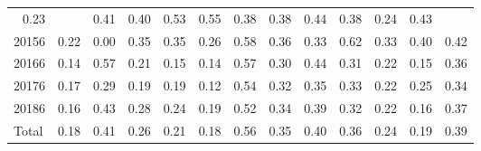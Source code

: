 \begin{table}[!h]
\begin{tabular}{lllllllllllll}
  \multicolumn{1}{|r}{0.23} &
  \multicolumn{1}{r}{} &
  \multicolumn{1}{r}{0.41} &
  \multicolumn{1}{r}{0.40} &
  \multicolumn{1}{r}{0.53} &
  \multicolumn{1}{r}{0.55} &
  \multicolumn{1}{r}{0.38} &
  \multicolumn{1}{r}{0.38} &
  \multicolumn{1}{r}{0.44} &
  \multicolumn{1}{r}{0.38} &
  \multicolumn{1}{r}{0.24} &
  \multicolumn{1}{r}{0.43} \\
\multicolumn{1}{l}{\hspace{1em}20156} &
  \multicolumn{1}{|r}{0.22} &
  \multicolumn{1}{r}{0.00} &
  \multicolumn{1}{r}{0.35} &
  \multicolumn{1}{r}{0.35} &
  \multicolumn{1}{r}{0.26} &
  \multicolumn{1}{r}{0.58} &
  \multicolumn{1}{r}{0.36} &
  \multicolumn{1}{r}{0.33} &
  \multicolumn{1}{r}{0.62} &
  \multicolumn{1}{r}{0.33} &
  \multicolumn{1}{r}{0.40} &
  \multicolumn{1}{r}{0.42} \\
\multicolumn{1}{l}{\hspace{1em}20166} &
  \multicolumn{1}{|r}{0.14} &
  \multicolumn{1}{r}{0.57} &
  \multicolumn{1}{r}{0.21} &
  \multicolumn{1}{r}{0.15} &
  \multicolumn{1}{r}{0.14} &
  \multicolumn{1}{r}{0.57} &
  \multicolumn{1}{r}{0.30} &
  \multicolumn{1}{r}{0.44} &
  \multicolumn{1}{r}{0.31} &
  \multicolumn{1}{r}{0.22} &
  \multicolumn{1}{r}{0.15} &
  \multicolumn{1}{r}{0.36} \\
\multicolumn{1}{l}{\hspace{1em}20176} &
  \multicolumn{1}{|r}{0.17} &
  \multicolumn{1}{r}{0.29} &
  \multicolumn{1}{r}{0.19} &
  \multicolumn{1}{r}{0.19} &
  \multicolumn{1}{r}{0.12} &
  \multicolumn{1}{r}{0.54} &
  \multicolumn{1}{r}{0.32} &
  \multicolumn{1}{r}{0.35} &
  \multicolumn{1}{r}{0.33} &
  \multicolumn{1}{r}{0.22} &
  \multicolumn{1}{r}{0.25} &
  \multicolumn{1}{r}{0.34} \\
\multicolumn{1}{l}{\hspace{1em}20186} &
  \multicolumn{1}{|r}{0.16} &
  \multicolumn{1}{r}{0.43} &
  \multicolumn{1}{r}{0.28} &
  \multicolumn{1}{r}{0.24} &
  \multicolumn{1}{r}{0.19} &
  \multicolumn{1}{r}{0.52} &
  \multicolumn{1}{r}{0.34} &
  \multicolumn{1}{r}{0.39} &
  \multicolumn{1}{r}{0.32} &
  \multicolumn{1}{r}{0.22} &
  \multicolumn{1}{r}{0.16} &
  \multicolumn{1}{r}{0.37} \\
\multicolumn{1}{l}{\hspace{1em}Total} &
  \multicolumn{1}{|r}{0.18} &
  \multicolumn{1}{r}{0.41} &
  \multicolumn{1}{r}{0.26} &
  \multicolumn{1}{r}{0.21} &
  \multicolumn{1}{r}{0.18} &
  \multicolumn{1}{r}{0.56} &
  \multicolumn{1}{r}{0.35} &
  \multicolumn{1}{r}{0.40} &
  \multicolumn{1}{r}{0.36} &
  \multicolumn{1}{r}{0.24} &
  \multicolumn{1}{r}{0.19} &
  \multicolumn{1}{r}{0.39} \\
\cline{1-13}
\end{tabular}
\end{table}
